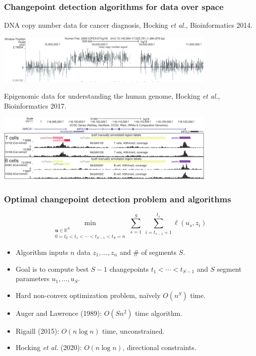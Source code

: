 \documentclass{beamer}
\newcommand{\RR}{\mathbb R}
\begin{document}
\begin{frame}
  \frametitle{Changepoint detection algorithms for data over space}

  DNA copy number data for cancer diagnosis, Hocking \emph{et
    al.}, Bioinformatics 2014.

  \includegraphics[width=0.8\textwidth]{intro-breakpoints}

  Epigenomic data for understanding the human genome, Hocking 
  \emph{et al.}, Bioinformatics 2017.

  \includegraphics[width=0.8\textwidth]{intro-peaks}

\end{frame}

\begin{frame}
  \frametitle{Optimal changepoint detection problem and algorithms}
  
  \vskip -1cm    
$$
\min_{\substack{
  \mathbf u\in\RR^{S}
\\
   0=t_0<t_1<\cdots<t_{S-1}<t_S=n
  }} 
    \sum_{s=1}^S\  \sum_{i=t_{s-1}+1}^{t_s} \ell( u_s,  z_i) 
$$
  \begin{itemize}
  \item Algorithm inputs $n$ data $z_1, \dots, z_n$ and \# of segments $S$.
  \item Goal is to compute best $S-1$ changepoints
    $t_1 < \cdots < t_{S-1}$ and $S$ segment parameters $u_1,\dots,u_S$.
  \item Hard non-convex optimization problem, na\" ively $O(n^S)$ time.
  \item Auger and Lawrence (1989): $O(Sn^2)$ time algorithm.
  \item Rigaill (2015): $O(n \log n)$ time, unconstrained.
  \item Hocking \emph{et al.} (2020): $O(n \log n)$, directional constraints.
  \end{itemize}
\end{frame}
\end{document}
